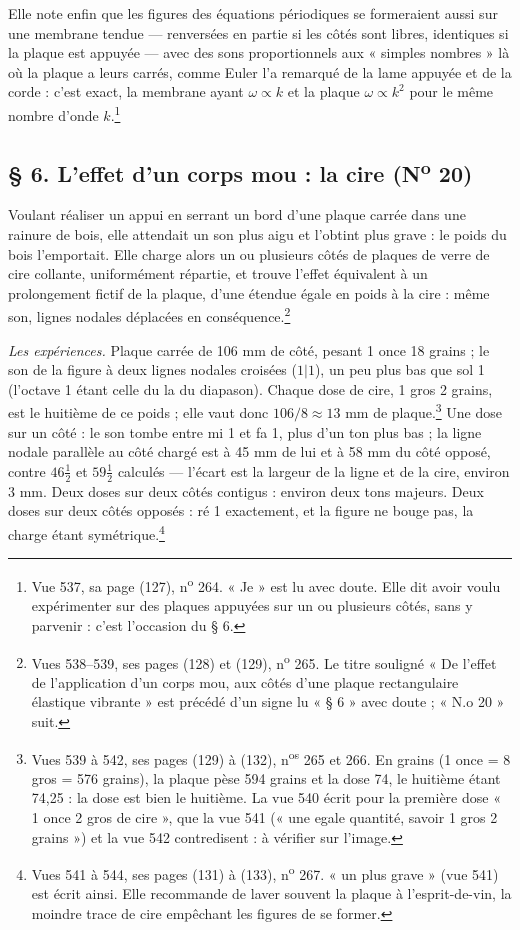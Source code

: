 \documentclass[11pt,a4paper]{article}
\begin{document}
Elle note enfin que les figures des équations périodiques se formeraient aussi
sur une membrane tendue — renversées en partie si les côtés sont libres,
identiques si la plaque est appuyée — avec des sons proportionnels aux « simples
nombres » là où la plaque a leurs carrés, comme Euler l'a remarqué de la lame
appuyée et de la corde : c'est exact, la membrane ayant $\omega \propto k$ et
la plaque $\omega \propto k^2$ pour le même nombre d'onde
$k$.\footnote{Vue 537, sa page (127), n\textsuperscript{o} 264. « Je » est lu
avec doute. Elle dit avoir voulu expérimenter sur des plaques appuyées sur un ou
plusieurs côtés, sans y parvenir : c'est l'occasion du § 6.}

\subsection*{§ 6. L'effet d'un corps mou : la cire (N\textsuperscript{o} 20)}

Voulant réaliser un appui en serrant un bord d'une plaque carrée dans une
rainure de bois, elle attendait un son plus aigu et l'obtint plus grave : le
poids du bois l'emportait. Elle charge alors un ou plusieurs côtés de
plaques de verre de cire collante, uniformément répartie, et
trouve l'effet équivalent à un prolongement fictif de la plaque, d'une étendue
égale en poids à la cire : même son, lignes nodales déplacées en
conséquence.\footnote{Vues 538--539, ses pages (128) et (129),
n\textsuperscript{o} 265. Le titre souligné « De l'effet de l'application d'un
corps mou, aux côtés d'une plaque rectangulaire élastique vibrante » est précédé
d'un signe lu « § 6 » avec doute ; « N.o 20 » suit.}

\emph{Les expériences.} Plaque carrée de 106 mm de côté, pesant 1 once 18
grains ; le son de la figure à deux lignes nodales croisées ($1|1$), un peu
plus bas que sol 1 (l'octave 1 étant celle du la du diapason). Chaque dose de
cire, 1 gros 2 grains, est le huitième de ce poids ; elle vaut donc
$106/8 \approx 13$ mm de plaque.\footnote{Vues 539 à 542, ses pages (129) à
(132), n\textsuperscript{os} 265 et 266. En grains (1 once = 8 gros = 576
grains), la plaque pèse 594 grains et la dose 74, le huitième étant 74,25 : la
dose est bien le huitième. La vue 540 écrit pour la première dose « 1 once 2 gros
de cire », que la vue 541 (« une egale quantité, savoir 1 gros 2 grains ») et la
vue 542 contredisent : à vérifier sur l'image.} Une dose sur un côté : le son
tombe entre mi 1 et fa 1, plus d'un ton plus bas ; la ligne nodale parallèle au
côté chargé est à 45 mm de lui et à 58 mm du côté opposé, contre $46\frac12$ et
$59\frac12$ calculés — l'écart est la largeur de la ligne et de la cire, environ
3 mm. Deux doses sur deux côtés contigus : environ deux tons majeurs. Deux doses
sur deux côtés opposés : ré 1 exactement, et la figure ne bouge pas, la charge
étant symétrique.\footnote{Vues 541 à 544, ses pages (131) à (133),
n\textsuperscript{o} 267. « un plus grave » (vue 541) est écrit ainsi. Elle
recommande de laver souvent la plaque à l'esprit-de-vin, la moindre trace de
cire empêchant les figures de se former.}
\end{document}
